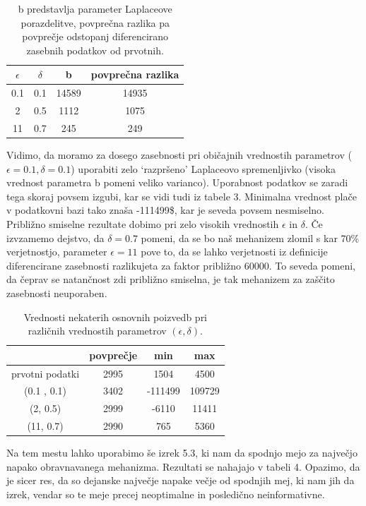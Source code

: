 \documentclass[12pt,a4paper]{amsart}
\theoremstyle{definition} %
\theoremstyle{plain} %
\begin{document}
\begin{table}[h]
\begin{center}
 \begin{tabular}{| c | c | c | c |} 
 \hline
 \textbf{$\epsilon$} & \textbf{$\delta$} & b & povprečna razlika  \\ [0.5ex] 
 \hline
 0.1 & 0.1 & 14589 & 14935  \\ 
 \hline
 2 & 0.5 & 1112 & 1075\\
 \hline
 11 & 0.7 & 245 & 249 \\
 \hline
\end{tabular}
\caption{b predstavlja parameter Laplaceove porazdelitve, povprečna razlika pa povprečje odstopanj diferencirano zasebnih podatkov od prvotnih. }
\end{center}
\end{table}
Vidimo, da moramo za dosego zasebnosti pri običajnih vrednostih parametrov ($\epsilon = 0.1, \delta = 0.1$) uporabiti zelo `razpršeno' Laplaceovo spremenljivko (visoka vrednost parametra b pomeni veliko varianco). Uporabnost podatkov se zaradi tega skoraj povsem izgubi, kar se vidi tudi iz tabele 3. Minimalna vrednost plače v podatkovni bazi tako znaša -111499\$, kar je seveda povsem nesmiselno. Približno smiselne rezultate dobimo pri zelo visokih vrednostih $\epsilon$ in $\delta$. Če izvzamemo dejstvo, da $\delta = 0.7$ pomeni, da se bo naš mehanizem zlomil s kar 70\% verjetnostjo, parameter $\epsilon = 11$ pove to, da se lahko verjetnosti iz definicije diferencirane zasebnosti razlikujeta za faktor približno 60000. To seveda pomeni, da čeprav se natančnost zdi približno smiselna, je tak mehanizem za zaščito zasebnosti neuporaben.
\begin{table}[h]
\begin{center}
 \begin{tabular}{| c | c | c | c |} 
 \hline
 & povprečje & min & max  \\ [0.5ex] 
 \hline
 prvotni podatki & 2995 & 1504 & 4500  \\ 
 \hline
 (0.1 , 0.1) & 3402 & -111499 & 109729\\
 \hline
 (2, 0.5) & 2999 & -6110 & 11411 \\
 \hline
 (11, 0.7) & 2990 & 765 & 5360 \\
 \hline
\end{tabular}
\caption{Vrednosti nekaterih osnovnih poizvedb pri različnih vrednostih parametrov $(\epsilon, \delta)$. }
\end{center}
\end{table}
Na tem mestu lahko uporabimo še izrek 5.3, ki nam da spodnjo mejo za največjo napako obravnavanega mehanizma. Rezultati se nahajajo v tabeli 4. Opazimo, da je sicer res, da so dejanske največje napake večje od spodnjih mej, ki nam jih da izrek, vendar so te meje precej neoptimalne in posledično neinformativne.
\end{document}
